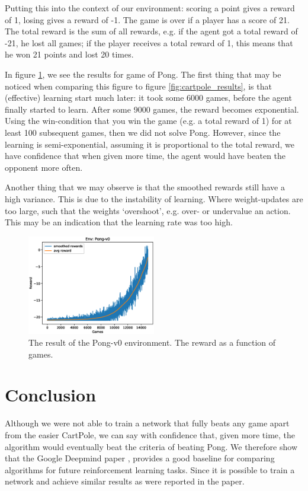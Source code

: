 \documentclass{article}
\begin{document}
Putting this into the context of our environment: scoring a point gives a reward of 1, losing gives a reward of -1. The game is over if a player has a score of 21. The total reward is the sum of all rewards, e.g. if the agent got a total reward of -21, he lost all games; if the player receives a total reward of 1, this means that he won 21 points and lost 20 times.

In figure \ref{fig:pong_results}, we see the results for game of Pong. The first thing that may be noticed when comparing this figure to figure \ref{fig:cartpole_results}, is that (effective) learning start much later: it took some 6000 games, before the agent finally started to learn. After some 9000 games, the reward becomes exponential. Using the win-condition that you win the game (e.g. a total reward of 1) for at least 100 subsequent games, then we did not solve Pong. However, since the learning is semi-exponential, assuming it is proportional to the total reward, we have confidence that when given more time, the agent would have beaten the opponent more often.

Another thing that we may observe is that the smoothed rewards still have a high variance. This is due to the instability of learning. Where weight-updates are too large, such that the weights `overshoot', e.g. over- or undervalue an action. This may be an indication that the learning rate was too high.
\begin{figure}[H]
\centering
\includegraphics[width=0.5\textwidth]{images/pong_results.eps}
\caption{The result of the Pong-v0 environment. The reward as a function of games.}
\label{fig:pong_results}
\end{figure}

\section{Conclusion}
Although we were not able to train a network that fully beats any game apart from the easier CartPole, we can say with confidence that, given more time, the algorithm would eventually beat the criteria of beating Pong. We therefore show that the Google Deepmind paper \cite{mnih2013playing}, provides a good baseline for comparing algorithms for future reinforcement learning tasks. Since it is possible to train a network and achieve similar results as were reported in the paper.
\end{document}
